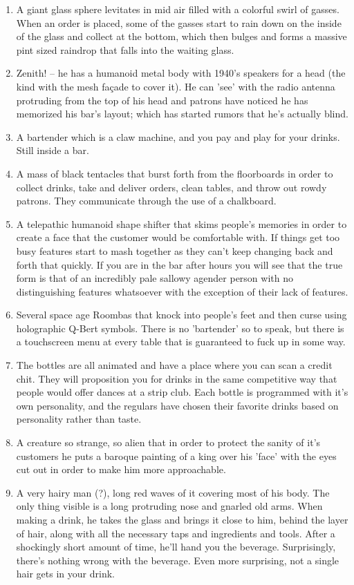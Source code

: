 \documentclass{article}
\begin{document}
\begin{enumerate}
	\item A giant glass sphere levitates in mid air filled with a colorful swirl of gasses. When an order is placed, some of the gasses start to rain down on the inside of the glass and collect at the bottom, which then bulges and forms a massive pint sized raindrop that falls into the waiting glass.
	\item Zenith! – he has a humanoid metal body with 1940's speakers for a head (the kind with the mesh façade to cover it). He can 'see' with the radio antenna protruding from the top of his head and patrons have noticed he has memorized his bar's layout; which has started rumors that he's actually blind.
	\item A bartender which is a claw machine, and you pay and play for your drinks. Still inside a bar.
	\item A mass of black tentacles that burst forth from the floorboards in order to collect drinks, take and deliver orders, clean tables, and throw out rowdy patrons. They communicate through the use of a chalkboard.
	\item A telepathic humanoid shape shifter that skims people's memories in order to create a face that the customer would be comfortable with. If things get too busy features start to mash together as they can't keep changing back and forth that quickly. If you are in the bar after hours you will see that the true form is that of an incredibly pale sallowy agender person with no distinguishing features whatsoever with the exception of their lack of features.
	\item Several space age Roombas that knock into people's feet and then curse using holographic Q-Bert symbols. There is no 'bartender' so to speak, but there is a touchscreen menu at every table that is guaranteed to fuck up in some way.
	\item The bottles are all animated and have a place where you can scan a credit chit. They will proposition you for drinks in the same competitive way that people would offer dances at a strip club. Each bottle is programmed with it's own personality, and the regulars have chosen their favorite drinks based on personality rather than taste.
	\item A creature so strange, so alien that in order to protect the sanity of it's customers he puts a baroque painting of a king over his 'face' with the eyes cut out in order to make him more approachable.
	\item A very hairy man (?), long red waves of it covering most of his body. The only thing visible is a long protruding nose and gnarled old arms. When making a drink, he takes the glass and brings it close to him, behind the layer of hair, along with all the necessary taps and ingredients and tools. After a shockingly short amount of time, he'll hand you the beverage. Surprisingly, there's nothing wrong with the beverage. Even more surprising, not a single hair gets in your drink.

\end{enumerate}
\end{document}
